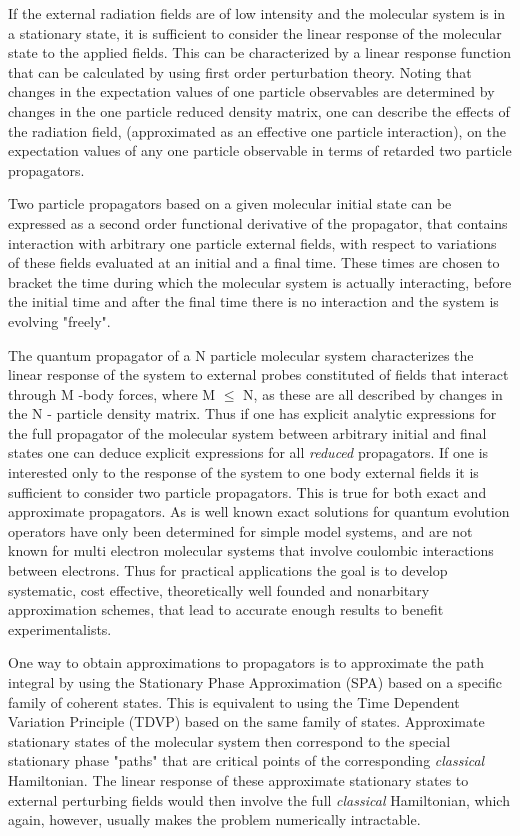 \documentclass{amsart}
\begin{document}
If the external radiation fields are of low intensity and the molecular
system is in a stationary state, it is sufficient to consider the linear
response of the molecular state to the applied fields. This can be
characterized by a linear response function that can be calculated by using
first order perturbation theory. Noting that changes in the expectation
values of one particle observables are determined by changes in the one
particle reduced density matrix, one can describe the effects of the
radiation field, (approximated as an effective one particle interaction), on
the expectation values of any one particle observable in terms of retarded
two particle propagators.

Two particle propagators based on a given molecular initial state can be
expressed as a second order functional derivative of the propagator, that
contains interaction with arbitrary one particle external fields, with
respect to variations of these fields evaluated at an initial and a final
time. These times are chosen to bracket the time during which the molecular
system is actually interacting, before the initial time and after the final
time there is no interaction and the system is evolving "freely".

The quantum propagator of a N particle molecular system characterizes the
linear response of the system to external probes constituted of fields that
interact through M -body forces, where M $\leqslant $ N, as these are all
described by changes in the N - particle density matrix. Thus if one has
explicit analytic expressions for the full propagator of the molecular
system between arbitrary initial and final states one can deduce explicit
expressions for all \textit{reduced }propagators. If one is interested only to the response
of the system to one body external fields it is sufficient to consider two
particle propagators. This is true for both exact and approximate
propagators. As is well known exact solutions for quantum evolution
operators have only been determined for simple model systems, and are not
known for multi electron molecular systems that involve coulombic
interactions between electrons. Thus for practical applications the goal is
to develop systematic, cost effective, theoretically well founded and
nonarbitary approximation schemes, that lead to accurate enough results to
benefit experimentalists.

One way to obtain approximations to propagators is to approximate the path
integral by using the Stationary Phase Approximation (SPA) based on a
specific family of coherent states. This is equivalent to using the Time
Dependent Variation Principle (TDVP) based on the same family of states.
Approximate stationary states of the molecular system then correspond to the
special stationary phase "paths" that are critical points of the
corresponding \textit{classical }Hamiltonian. The linear response of these approximate
stationary states to external perturbing fields would then involve the full
\textit{classical }Hamiltonian, which again, however, usually makes the problem numerically
intractable.
\end{document}
